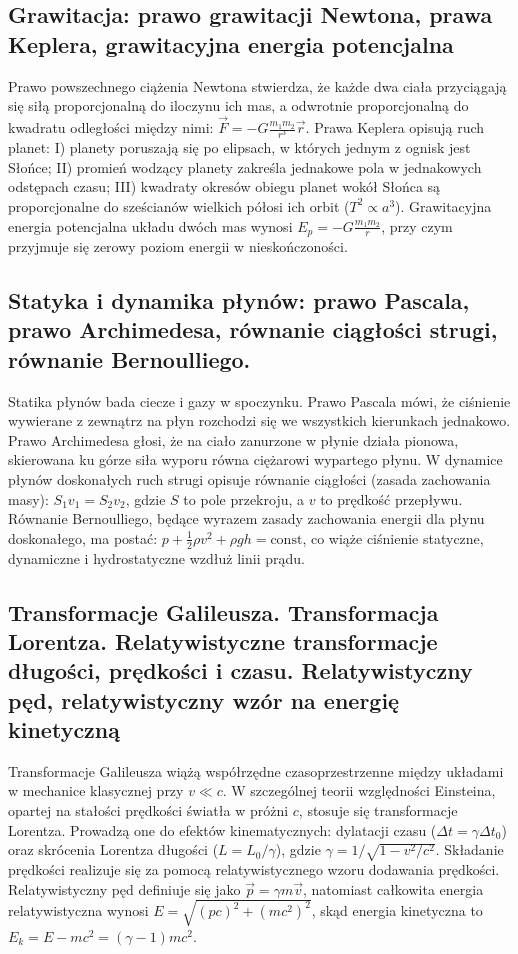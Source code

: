 \documentclass[11pt,a4paper]{article}
\begin{document}
\subsection{Grawitacja: prawo grawitacji Newtona, prawa Keplera, grawitacyjna energia potencjalna}
Prawo powszechnego ciążenia Newtona stwierdza, że każde dwa ciała przyciągają się siłą proporcjonalną do iloczynu ich mas, a odwrotnie proporcjonalną do kwadratu odległości między nimi: $\vec{F} = -G \frac{m_1 m_2}{r^3} \vec{r}$. Prawa Keplera opisują ruch planet: I) planety poruszają się po elipsach, w których jednym z ognisk jest Słońce; II) promień wodzący planety zakreśla jednakowe pola w jednakowych odstępach czasu; III) kwadraty okresów obiegu planet wokół Słońca są proporcjonalne do sześcianów wielkich półosi ich orbit ($T^2 \propto a^3$). Grawitacyjna energia potencjalna układu dwóch mas wynosi $E_p = -G \frac{m_1 m_2}{r}$, przy czym przyjmuje się zerowy poziom energii w nieskończoności.

\subsection{Statyka i dynamika płynów: prawo Pascala, prawo Archimedesa, równanie ciągłości strugi, równanie Bernoulliego.}
Statika płynów bada ciecze i gazy w spoczynku. Prawo Pascala mówi, że ciśnienie wywierane z zewnątrz na płyn rozchodzi się we wszystkich kierunkach jednakowo. Prawo Archimedesa głosi, że na ciało zanurzone w płynie działa pionowa, skierowana ku górze siła wyporu równa ciężarowi wypartego płynu. W dynamice płynów doskonałych ruch strugi opisuje równanie ciągłości (zasada zachowania masy): $S_1 v_1 = S_2 v_2$, gdzie $S$ to pole przekroju, a $v$ to prędkość przepływu. Równanie Bernoulliego, będące wyrazem zasady zachowania energii dla płynu doskonałego, ma postać: $p + \frac{1}{2}\rho v^2 + \rho g h = \text{const}$, co wiąże ciśnienie statyczne, dynamiczne i hydrostatyczne wzdłuż linii prądu.

\subsection{Transformacje Galileusza. Transformacja Lorentza. Relatywistyczne transformacje długości, prędkości i czasu. Relatywistyczny pęd, relatywistyczny wzór na energię kinetyczną}
Transformacje Galileusza wiążą współrzędne czasoprzestrzenne między układami w mechanice klasycznej przy $v \ll c$. W szczególnej teorii względności Einsteina, opartej na stałości prędkości światła w próżni $c$, stosuje się transformacje Lorentza. Prowadzą one do efektów kinematycznych: dylatacji czasu ($\Delta t = \gamma \Delta t_0$) oraz skrócenia Lorentza długości ($L = L_0 / \gamma$), gdzie $\gamma = 1/\sqrt{1 - v^2/c^2}$. Składanie prędkości realizuje się za pomocą relatywistycznego wzoru dodawania prędkości. Relatywistyczny pęd definiuje się jako $\vec{p} = \gamma m \vec{v}$, natomiast całkowita energia relatywistyczna wynosi $E = \sqrt{(pc)^2 + (mc^2)^2}$, skąd energia kinetyczna to $E_k = E - mc^2 = (\gamma - 1)mc^2$.
\end{document}
